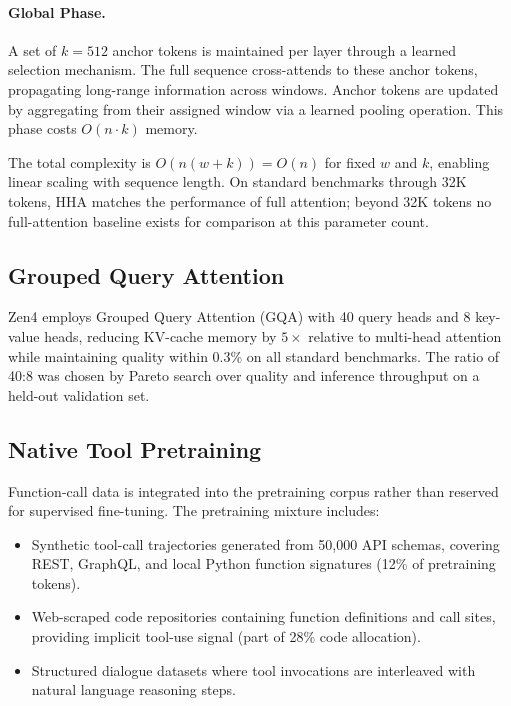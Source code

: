\documentclass[11pt,a4paper]{article}
\begin{document}
\paragraph{Global Phase.} A set of $k = 512$ anchor tokens is maintained per layer through a
learned selection mechanism. The full sequence cross-attends to these anchor tokens, propagating
long-range information across windows. Anchor tokens are updated by aggregating from their
assigned window via a learned pooling operation. This phase costs $O(n \cdot k)$ memory.

The total complexity is $O(n(w + k)) = O(n)$ for fixed $w$ and $k$, enabling linear scaling
with sequence length. On standard benchmarks through 32K tokens, HHA matches the performance
of full attention; beyond 32K tokens no full-attention baseline exists for comparison at this
parameter count.

\subsection{Grouped Query Attention}

Zen4 employs Grouped Query Attention (GQA) with 40 query heads and 8 key-value heads, reducing
KV-cache memory by $5\times$ relative to multi-head attention while maintaining quality within
0.3\% on all standard benchmarks. The ratio of 40:8 was chosen by Pareto search over quality
and inference throughput on a held-out validation set.

\subsection{Native Tool Pretraining}

Function-call data is integrated into the pretraining corpus rather than reserved for
supervised fine-tuning. The pretraining mixture includes:

\begin{itemize}
    \item Synthetic tool-call trajectories generated from 50,000 API schemas, covering
    REST, GraphQL, and local Python function signatures (12\% of pretraining tokens).
    \item Web-scraped code repositories containing function definitions and call sites,
    providing implicit tool-use signal (part of 28\% code allocation).
    \item Structured dialogue datasets where tool invocations are interleaved with
    natural language reasoning steps.
\end{itemize}
\end{document}
